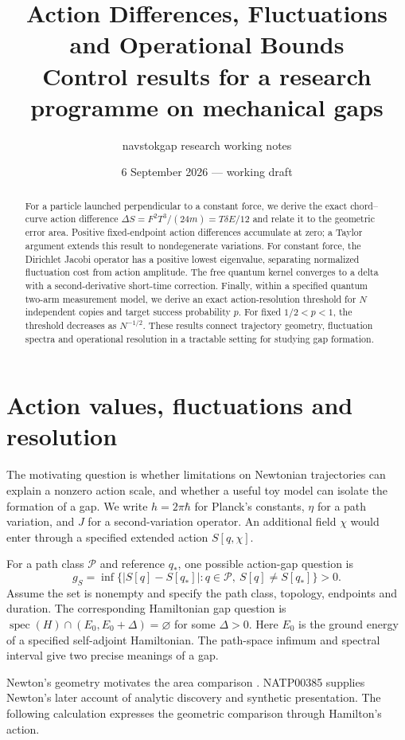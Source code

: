\documentclass[11pt,a4paper]{article}
\title{Action Differences, Fluctuations and Operational Bounds\\
\large Control results for a research programme on mechanical gaps}
\author{navstokgap research working notes}
\date{6 September 2026 --- working draft}
\begin{document}
\maketitle
\begin{abstract}
For a particle launched perpendicular to a constant force, we derive the exact
chord--curve action difference $\Delta S=F^2T^3/(24m)=T\delta E/12$ and relate it
to the geometric error area. Positive fixed-endpoint action differences accumulate
at zero; a Taylor argument extends this result to nondegenerate variations.
For constant force, the Dirichlet Jacobi operator has a positive lowest eigenvalue,
separating normalized fluctuation cost from action amplitude. The free quantum kernel
converges to a delta with a second-derivative short-time correction. Finally,
within a specified quantum two-arm measurement model, we derive an exact
action-resolution threshold for $N$ independent copies and target success
probability $p$. For fixed $1/2<p<1$, the threshold decreases as $N^{-1/2}$.
These results connect trajectory geometry, fluctuation spectra and operational
resolution in a tractable setting for studying gap formation.
\end{abstract}

\section{Action values, fluctuations and resolution}
The motivating question is whether limitations on Newtonian trajectories can
explain a nonzero action scale, and whether a useful toy model can isolate the
formation of a gap. We write $h=2\pi\hbar$ for Planck's constants, $\eta$ for a path
variation, and $J$ for a second-variation operator. An additional field $\chi$
would enter through a specified extended action $S[q,\chi]$.

For a path class $\mathcal P$ and reference $q_*$, one possible action-gap question is
\[
 g_S=\inf\{ |S[q]-S[q_*]|:q\in\mathcal P,\ S[q]\ne S[q_*]\}>0.
\]
Assume the set is nonempty and specify the path class, topology, endpoints and
duration. The corresponding Hamiltonian gap question is
$\operatorname{spec}(H)\cap(E_0,E_0+\Delta)=\varnothing$ for some $\Delta>0$.
Here $E_0$ is the ground energy of a specified self-adjoint Hamiltonian. The
path-space infimum and spectral interval give two precise meanings of a gap.

Newton's geometry motivates the area comparison
\cite{Newton1846,NewtonWilkins}. NATP00385 \cite{NewtonNATP00385} supplies Newton's
later account of analytic discovery and synthetic presentation. The following
calculation expresses the geometric comparison through Hamilton's action.
\end{document}
